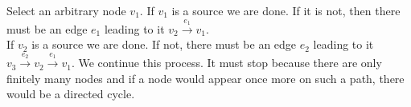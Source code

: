 \begin{prooof}
    Select an arbitrary node $v_{1}$. If $v_{1}$ is a source we are done. If it is not, then there must be an edge $e_{1}$
    leading to it $v_{2} \xrightarrow{e_{1}} v_{1}$. \\
    If $v_{2}$ is a source we are done. If not, there must be an edge $e_{2}$ leading to it
    $v_{3}  \xrightarrow{e_{2}} v_{2} \xrightarrow{e_{1}} v_{1}$.
    We continue this process. It must stop because there are only finitely many nodes and if a node would appear once more
    on such a path, there would be a directed cycle.
\end{prooof}






